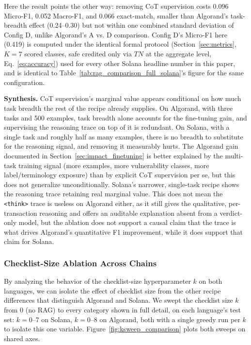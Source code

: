 \documentclass[lettersize,journal]{IEEEtran}
\begin{document}
Here the result points the other way: removing CoT supervision costs 0.096 Micro-F1, 0.052 Macro-F1,
and 0.066 exact-match, smaller than Algorand's task-breadth effect (0.24--0.30) but not within one
combined standard deviation of Config D, unlike Algorand's A vs. D comparison. Config D's Micro-F1
here (0.419) is computed under the identical formal protocol (Section~\ref{sec:metrics}, $K=7$
scored classes, safe credited only via $TN$ at the aggregate level,
Eq.~\eqref{eq:accuracy}) used for every other Solana headline number in this paper, and is identical
to Table~\ref{tab:rag_comparison_full_solana}'s figure for the same configuration.

\textbf{Synthesis.} CoT supervision's marginal value appears conditional on how
much task breadth the rest of the recipe already supplies. On Algorand, with three tasks and 500
examples, task breadth alone accounts for the fine-tuning gain, and supervising the reasoning trace
on top of it is redundant. On Solana, with a single task and roughly half as many examples,
there is no breadth to substitute for the reasoning signal, and removing it measurably hurts. The Algorand 
gain documented in
Section~\ref{sec:impact_finetuning} is better explained by the multi-task training signal (more
examples, more vulnerability classes, more label/terminology exposure) than by explicit
CoT supervision per se, but this does not generalize unconditionally. Solana's
narrower, single-task recipe shows the reasoning trace retaining real marginal value. This does not
mean the \texttt{<think>} trace is useless on Algorand either, as it still gives the qualitative,
per-transaction reasoning and offers an auditable explanation absent from a verdict-only model,
but the ablation does not support a causal claim
that the trace is what drives Algorand's quantitative F1 improvement, while it does support that
claim for Solana.

\subsubsection{Checklist-Size Ablation Across Chains}
\label{sec:ksweep_combined}

By analyzing the behavior of the checklist-size hyperparameter $k$ on both languages, we can isolate the effect of
    checklist size from the other recipe differences that distinguish Algorand and Solana. We swept the 
    checklist size $k$ from 0 (no RAG)
to every category shown in full detail, on each language's test set: $k=0$--7 on Solana, $k=0$--8 on Algorand, both with a single
greedy run per $k$ to isolate this one variable. Figure~\ref{fig:ksweep_comparison} plots both sweeps on shared
axes.
\end{document}
